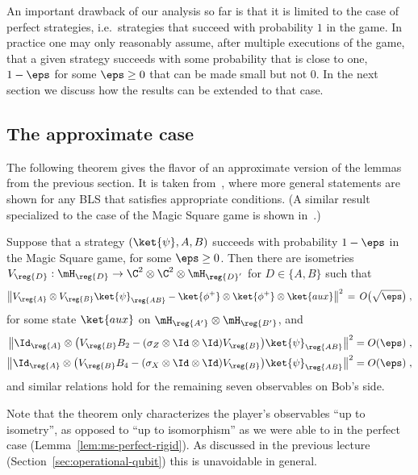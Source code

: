 An important drawback of our analysis so far is that it is limited to the case of perfect strategies, i.e.\ strategies that succeed with probability $1$ in the game. In practice one may only reasonably assume, after multiple executions of the game, that a given strategy succeeds with some probability that is close to one, $1-\eps$ for some $\eps\geq 0$ that can be made small but not $0$. In the next section we discuss how the results can be extended to that case. 

\subsection{The approximate case}

The following theorem gives the flavor of an approximate version of the lemmas from the previous section. It is taken from~\cite{coladangelo2017robust}, where more general statements are shown for any BLS that satisfies appropriate conditions. (A similar result specialized to the case of the Magic Square game is shown in~\cite{wu2016device}.)

\begin{theorem}\label{thm:ms-robust}
Suppose that a strategy $(\ket{\psi},A,B)$ succeeds with probability $1-\eps$ in the Magic Square game, for some $\eps\geq 0$. Then there are isometries $V_\reg{D}:\mH_\reg{D}\to \C^2 \otimes \C^2 \otimes \mH_{\reg{D}'}$ for $D\in\{A,B\}$ such that
\[ \big\| V_\reg{A} \otimes V_{\reg{B}} \ket{\psi}_{\reg{AB}} - \ket{\phi^+}\otimes \ket{\phi^+} \otimes \ket{aux} \big\|^2 \,=\, O\big(\sqrt{\eps}\big)\;,\]
for some state $\ket{aux}$ on $\mH_{\reg{A'}}\otimes \mH_{\reg{B'}}$, and
\begin{align*} 
\big\| \Id_\reg{A} \otimes \big( V_\reg{B} B_2 -  (\sigma_Z\otimes \Id \otimes \Id) V_\reg{B}\big)\ket{\psi}_{\reg{AB}}\big\|^2 &= O(\eps)\;,\\
\big\| \Id_\reg{A} \otimes \big( V_\reg{B} B_4 -  (\sigma_X\otimes \Id \otimes \Id) V_\reg{B}\big)\ket{\psi}_{\reg{AB}}\big\|^2 &= O(\eps)\;,
\end{align*}
and similar relations hold for the remaining seven observables on Bob's side. 
\end{theorem}

Note that the theorem only characterizes the player's observables ``up to isometry'', as opposed to ``up to isomorphism'' as we were able to in the perfect case (Lemma~\ref{lem:ms-perfect-rigid}). As discussed in the previous lecture (Section~\ref{sec:operational-qubit}) this is unavoidable in general. 

